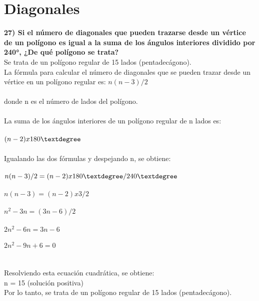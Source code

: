 \documentclass{article}
\begin{document}
\section*{\large\textbf{Diagonales}}
{\bf 27) Si el número de diagonales que pueden trazarse desde un vértice de un polígono es igual a la suma de los ángulos interiores dividido por 240°, ¿De qué polígono se trata? }\\
Se trata de un polígono regular de 15 lados (pentadecágono).\\
La fórmula para calcular el número de diagonales que se pueden trazar desde un vértice en un polígono regular es: $n(n-3)/2$\\
\\
donde n es el número de lados del polígono.\\
\\
La suma de los ángulos interiores de un polígono regular de n lados es:\\
\\
$(n-2) x 180\textdegree$\\
\\
Igualando las dos fórmulas y despejando n, se obtiene:\\
\\
$n(n-3)/2 = (n-2) x 180\textdegree / 240\textdegree$\\
\\
$n(n-3) = (n-2) x 3/2$\\
\\
$n^2 - 3n = (3n - 6) / 2$\\
\\
$2n^2 - 6n = 3n - 6$\\
\\
$2n^2 - 9n + 6 = 0$\\
\\
\\
Resolviendo esta ecuación cuadrática, se obtiene:\\
n = 15 (solución positiva)\\
Por lo tanto, se trata de un polígono regular de 15 lados (pentadecágono).\\
\end{document}
